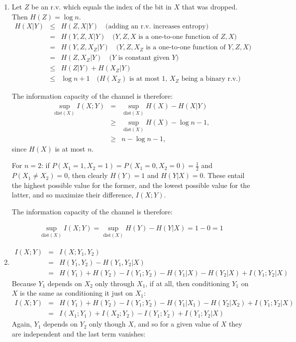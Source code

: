 \documentclass[11pt]{article} \usepackage{amssymb}
\newcommand{\half}{{\textstyle \frac12}}
\begin{document}
\begin{enumerate}
\item

Let $Z$ be an r.v. which equals the index of the bit in $X$ that was
dropped. Then $H(Z)=\log n$. 
\begin{eqnarray*}
  H(X|Y)&\leq& H(Z,X|Y) 
\quad\mbox{(adding an r.v. increases entropy)}
\\      &=&H(Y,Z,X|Y)   
\quad\mbox{($Y,Z,X$ is a one-to-one function of $Z,X$)}
\\      &=&H(Y,Z,X_Z|Y) 
\quad\mbox{($Y,Z,X_Z$ is a one-to-one function of $Y,Z,X$)}
\\      &=&H(Z, X_Z|Y)
\quad\mbox{($Y$ is constant given $Y$)}
\\      &\leq&H(Z|Y)+H(X_Z|Y)
\\      &\leq& \log n + 1
\quad\mbox{($H(X_Z)$ is at most 1, $X_Z$ being a binary r.v.)}
\end{eqnarray*}

The information capacity of the channel is therefore:
\begin{eqnarray*}
  \sup_{\mbox{dist}(X)}I(X;Y)&=&\sup_{\mbox{dist}(X)}H(X)-H(X|Y)
\\                        &\geq&\sup_{\mbox{dist}(X)}H(X)-\log n - 1,
\\                        &\geq&n-\log n - 1,
\end{eqnarray*}
since $H(X)$ is at most $n$.

For $n=2$: if $P(X_1=1,X_2=1)=P(X_1=0,X_2=0)=\half$ and $P(X_1\not=X_2)=0$,
then clearly $H(Y)=1$ and $H(Y|X)=0$. These entail the highest possible value
for the former, and the lowest possible value for the latter, and so maximize
their difference, $I(X;Y)$.

The information capacity of the channel is therefore:

\begin{eqnarray*}
  \sup_{\mbox{dist}(X)}I(X;Y)=\sup_{\mbox{dist}(X)}H(Y)-H(Y|X)=1-0=1
\end{eqnarray*}

\item
  \begin{eqnarray*}
    I(X;Y)&=&I(X;Y_1,Y_2)
   \\ &=&H(Y_1,Y_2)-H(Y_1,Y_2|X)
   \\ &=&H(Y_1)+H(Y_2)-I(Y_1;Y_2)-H(Y_1|X)-H(Y_2|X)+I(Y_1;Y_2|X)
   \end{eqnarray*}
   Because $Y_1$ depends on $X_2$ only through $X_1$, if at all, then 
   conditioning $Y_1$ on $X$ is the same as conditioning it just on $X_1$:
  \begin{eqnarray*}
    I(X;Y)&=&H(Y_1)+H(Y_2)-I(Y_1;Y_2)-H(Y_1|X_1)-H(Y_2|X_2)+I(Y_1;Y_2|X)
   \\ &=&I(X_1;Y_1)+I(X_2;Y_2)-I(Y_1;Y_2)+I(Y_1;Y_2|X)
  \end{eqnarray*}
  Again, $Y_1$ depends on $Y_2$ only though $X$, and so for a given
  value of $X$ they are independent and the last term vanishes:


\end{enumerate}
\end{document}
